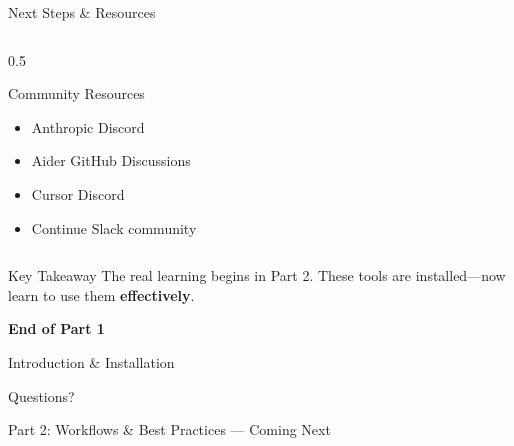 \documentclass[aspectratio=169,11pt]{beamer}
\begin{document}
\begin{frame}{Next Steps \& Resources}
\begin{columns}[T]
\begin{column}{0.5\textwidth}
            \begin{block}{Community Resources}
                \small
                \begin{itemize}
                    \item Anthropic Discord
                    \item Aider GitHub Discussions
                    \item Cursor Discord
                    \item Continue Slack community
                \end{itemize}
            \end{block}
        \end{column}
    \end{columns}

    \vspace{0.2cm}
    \begin{alertblock}{Key Takeaway}
        The real learning begins in Part 2. These tools are installed---now learn to use them \textbf{effectively}.
    \end{alertblock}

\end{frame}

\begin{frame}[plain]
    \begin{center}
        \vspace{2cm}
        {\Huge\textcolor{Garnet}{\textbf{End of Part 1}}}

        \vspace{1cm}
        {\Large Introduction \& Installation}

        \vspace{1cm}
        {\large Questions?}

        \vspace{2cm}
        {\small
            \textcolor{Atlantic}{Part 2: Workflows \& Best Practices} --- Coming Next
        }
    \end{center}
\end{frame}

\end{document}
